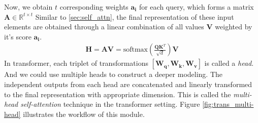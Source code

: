 Now, we obtain $t$ corresponding weights $\mathbf{a_i}$ for each query, which forms a matrix $\mathbf{A} \in \mathbb{R}^{t \times t}$
Similar to \ref{sec:self_attn}, the final representation of these input elements are obtained through a linear combination of all values $\mathbf{V}$ weighted by it's score $\mathbf{a_i}$.
\begin{align}
    \mathbf{H} = \mathbf{A} \mathbf{V} = \mathrm{softmax}(\frac{\mathbf{Q}\mathbf{K}^T}{\sqrt{d}}) \mathbf{V}
\end{align}
In transformer, each triplet of transformations $[\mathbf{W_q}, \mathbf{W_k}, \mathbf{W_v}]$ is called a \textit{head}. 
And we could use multiple heads to construct a deeper modeling. The independent outputs from each head are concatenated and linearly transformed to the final representation with appropriate dimension. This is called the \textit{multi-head self-attention} technique in the transformer setting. 
Figure \ref{fig:trans_multi-head} illustrates the workflow of this module.

